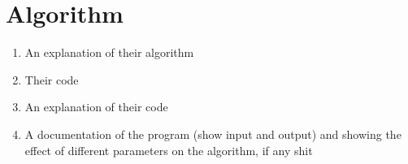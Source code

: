 \chapter{Algorithm}
	\begin{enumerate}
		\item An explanation of their algorithm
		\item Their code
		\item An explanation of their code
		\item A documentation of the program (show input and output) and showing the effect of different parameters on the algorithm, if any shit
	\end{enumerate}